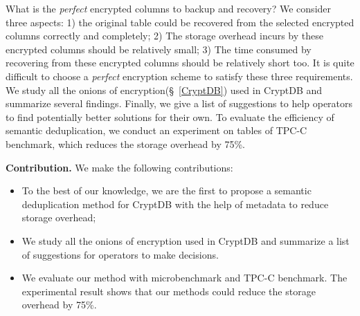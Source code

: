 What is the \textit{perfect} encrypted columns to backup and recovery? We consider three aspects: 1) the original table could be recovered from the selected encrypted columns correctly and completely; 2) The storage overhead incurs by these encrypted columns should be relatively small; 3) The time consumed by recovering from these encrypted columns should be relatively short too. It is quite difficult to choose a \textit{perfect} encryption scheme to satisfy these three requirements. We study all the onions of encryption(\S~\ref{CryptDB}) used in CryptDB and summarize several findings. Finally, we give a list of suggestions to help operators to find potentially better solutions for their own. To evaluate the efficiency of semantic deduplication, we conduct an experiment on tables of TPC-C benchmark, which reduces the storage overhead by 75\%.

\textbf{Contribution.} We make the following contributions:
\begin{itemize}
\item To the best of our knowledge, we are the first to propose a semantic deduplication method for CryptDB with the help of metadata to reduce storage overhead;
\item We study all the onions of encryption used in CryptDB and summarize a list of suggestions for operators to make decisions.
\item We evaluate our method with microbenchmark and TPC-C benchmark. The experimental result shows that our methods could reduce the storage overhead by 75\%.
\end{itemize}






